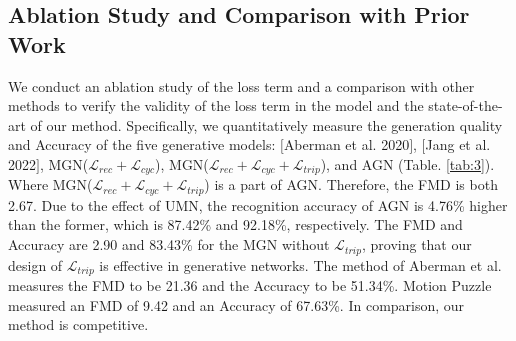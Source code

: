 \begin{table}
  \centering
  \caption{Top-1 accuracy comparison. Sampling one-shot and few-shot (1\%, 5\%, and 10\%) from $\mathcal{M}_{\hat{train}}$ for action generation. The generated and sampled actions are concatenated into a new train set to train and test the ST-GCN. }
  \label{tab:2}
\end{table}

\subsection{Ablation Study and Comparison with Prior Work}

We conduct an ablation study of the loss term and a comparison with other methods to verify the validity of the loss term in the model and the state-of-the-art of our method. 
Specifically, we quantitatively measure the generation quality and Accuracy of the five generative models: 
$[$Aberman et al. 2020$]$, 
$[$Jang et al. 2022$]$, 
MGN($\mathcal{L}_{rec}+\mathcal{L}_{cyc}$), 
MGN($\mathcal{L}_{rec}+\mathcal{L}_{cyc}+\mathcal{L}_{trip}$), and AGN (Table. \ref{tab:3}).
Where MGN($\mathcal{L}_{rec}+\mathcal{L}_{cyc}+\mathcal{L}_{trip}$) is a part of AGN. Therefore, the FMD is both 2.67. 
Due to the effect of UMN, the recognition accuracy of AGN is 4.76\% higher than the former, which is 87.42\% and 92.18\%, respectively. 
The FMD and Accuracy are 2.90 and 83.43\% for the MGN without $\mathcal{L}_{trip}$, proving that our design of $\mathcal{L}_{trip}$ is effective in generative networks. The method of Aberman et al. measures the FMD to be 21.36 and the Accuracy to be 51.34\%. Motion Puzzle measured an FMD of 9.42 and an Accuracy of 67.63\%.
In comparison, our method is competitive.

